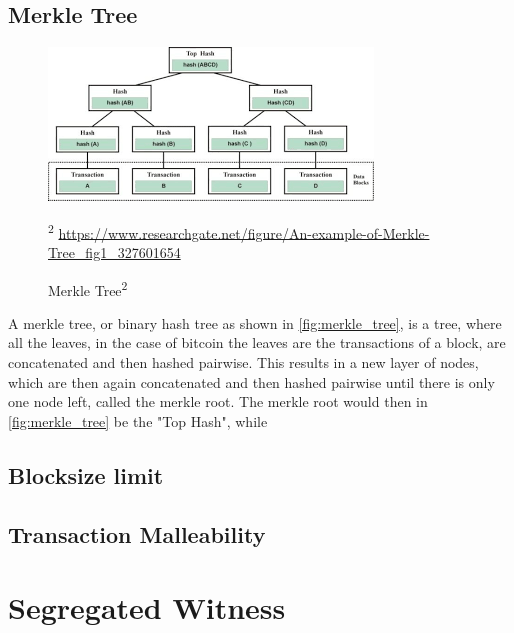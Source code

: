 \subsection{Merkle Tree}
\begin{figure}[!ht]
    \centering
    \includegraphics[width=(\textwidth * 2 / 3 )]{Ausarbeitung/images/merkle_tree.png}
    \caption[Merkle Tree]{Merkle Tree\textsuperscript{2}}
    \small\textsuperscript{2} \url{https://www.researchgate.net/figure/An-example-of-Merkle-Tree_fig1_327601654} 
    \label{fig:merkle_tree}
\end{figure}
A merkle tree, or binary hash tree as shown in \autoref{fig:merkle_tree}, is a tree, where all the leaves, in the case of bitcoin the leaves are the transactions of a block, are concatenated and then hashed pairwise. This results in a new layer of nodes, which are then again concatenated and then hashed pairwise until there is only one node left, called the merkle root. The merkle root would then in \autoref{fig:merkle_tree} be the "Top Hash", while 


\subsection{Blocksize limit}
\label{sec:Basics:BlocksizeLimit}




\subsection{Transaction Malleability}
\label{ch:TransactionMalleability}




\section{Segregated Witness}
\label{ch:SegWit}

